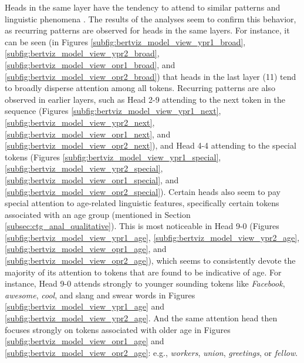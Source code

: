 Heads in the same layer have the tendency to attend to similar patterns and linguistic phenomena \cite{clark-etal-2019-bert}. The results of the analyses seem to confirm this behavior, as recurring patterns are observed for heads in the same layers. For instance, it can be seen (in Figures \ref{subfig:bertviz_model_view_ypr1_broad}, \ref{subfig:bertviz_model_view_ypr2_broad}, \ref{subfig:bertviz_model_view_opr1_broad}, and \ref{subfig:bertviz_model_view_opr2_broad}) that heads in the last layer (11) tend to broadly disperse attention among all tokens. Recurring patterns are also observed in earlier layers, such as Head 2-9 attending to the next token in the sequence (Figures \ref{subfig:bertviz_model_view_ypr1_next}, \ref{subfig:bertviz_model_view_ypr2_next}, \ref{subfig:bertviz_model_view_opr1_next}, and \ref{subfig:bertviz_model_view_opr2_next}), and Head 4-4 attending to the special tokens (Figures \ref{subfig:bertviz_model_view_ypr1_special}, \ref{subfig:bertviz_model_view_ypr2_special}, \ref{subfig:bertviz_model_view_opr1_special}, and \ref{subfig:bertviz_model_view_opr2_special}). Certain heads also seem to pay special attention to age-related linguistic features, specifically certain tokens associated with an age group (mentioned in Section \ref{subsec:ctg_anal_qualitative}). This is most noticeable in Head 9-0 (Figures \ref{subfig:bertviz_model_view_ypr1_age}, \ref{subfig:bertviz_model_view_ypr2_age}, \ref{subfig:bertviz_model_view_opr1_age}, and \ref{subfig:bertviz_model_view_opr2_age}), which seems to consistently devote the majority of its attention to tokens that are found to be indicative of age. For instance, Head 9-0 attends strongly to younger sounding tokens like \textit{Facebook}, \textit{awesome}, \textit{cool}, and slang and swear words in Figures \ref{subfig:bertviz_model_view_ypr1_age} and \ref{subfig:bertviz_model_view_ypr2_age}. And the same attention head then focuses strongly on tokens associated with older age in Figures \ref{subfig:bertviz_model_view_opr1_age} and \ref{subfig:bertviz_model_view_opr2_age}: e.g., \textit{workers}, \textit{union}, \textit{greetings}, or \textit{fellow}.


